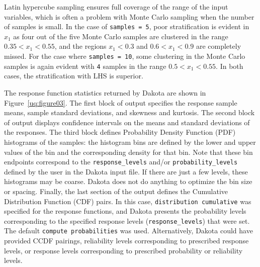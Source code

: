 Latin hypercube sampling ensures full coverage of the range of the
input variables, which is often a problem with Monte Carlo sampling
when the number of samples is small. In the case of \texttt{samples =
5}, poor stratification is evident in $x_1$ as four out of the five
Monte Carlo samples are clustered in the range $0.35 < x_1 < 0.55$,
and the regions $x_1 < 0.3$ and $0.6 < x_1 < 0.9$ are completely
missed. For the case where \texttt{samples = 10}, some clustering in
the Monte Carlo samples is again evident with \texttt{4} samples in
the range $0.5 < x_1 < 0.55$. In both cases, the stratification with
LHS is superior. 

The response function statistics returned by Dakota
are shown in Figure~\ref{uq:figure03}. The first block of output
specifies the response sample means, sample standard deviations, and 
skewness and kurtosis.  The second block of output displays confidence 
intervals on the means and standard deviations of the responses.  
The third block defines Probability Density Function (PDF) histograms 
of the samples: the histogram bins are defined by the lower and upper 
values of the bin and the corresponding density for that bin.  
Note that these bin endpoints correspond to the \texttt{response\_levels} 
and/or \texttt{probability\_levels} defined by the user in the Dakota 
input file.  If there are just a few levels, these histograms may be coarse. 
Dakota does not do anything to optimize the bin size or spacing. 
Finally, the last section of the output defines the Cumulative Distribution 
Function (CDF) pairs.  In this case, 
\texttt{distribution cumulative} was specified for the response
functions, and Dakota presents the probability levels corresponding to the
specified response levels (\texttt{response\_levels}) that were set.
The
default \texttt{compute probabilities} was used. Alternatively,
Dakota could have provided CCDF pairings, reliability levels
corresponding to prescribed response levels, or response levels
corresponding to prescribed probability or reliability levels.

